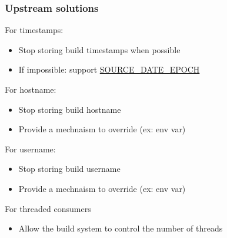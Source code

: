 \begin{frame}
	\frametitle{Upstream solutions}
	For timestamps:
	\begin{itemize}
		\item Stop storing build timestamps when possible
			\pause
		\item If impossible: support \href{https://reproducible-builds.org/specs/source-date-epoch/}{SOURCE\_DATE\_EPOCH}
	\end{itemize}
	\pause
	For hostname:
	\begin{itemize}
		\item Stop storing build hostname
		\pause
		\item Provide a mechnaism to override (ex: env var)
	\end{itemize}
	\pause
	For username:
	\begin{itemize}
		\item Stop storing build username
			\pause
		\item Provide a mechnaism to override (ex: env var)
	\end{itemize}
	\pause
	For threaded consumers
	\begin{itemize}
		\item Allow the build system to control the number of threads
	\end{itemize}
\end{frame}

